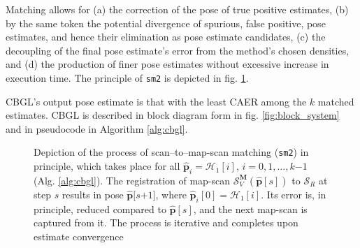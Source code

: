 Matching allows for (a) the correction of the pose of true positive estimates,
(b) by the same token the potential divergence of spurious, false positive,
pose estimates, and hence their elimination as pose estimate candidates, (c)
the decoupling of the final pose estimate's error from the method's chosen
densities, and (d) the production of finer pose estimates without excessive
increase in execution time. The principle of \texttt{sm2} is depicted in fig.
\ref{fig:sm2_evolution}.

CBGL's output pose estimate is that with the least CAER among the $k$ matched
estimates. CBGL is described in block diagram form in fig.
\ref{fig:block_system} and in pseudocode in Algorithm \ref{alg:cbgl}.

\begin{figure}[]\vspace{1.5cm}
  
  \caption{\small Depiction of the process of scan--to--map-scan matching
           (\texttt{sm2}) in principle, which takes place for all
           $\hat{\bm{p}}_i = \mathcal{H}_1[i]$, $i=0,1,\dots,k$$-$$1$ (Alg.
           \ref{alg:cbgl}). The registration of map-scan
           $\mathcal{S}_V^{\bm{M}}(\hat{\bm{p}}[s])$ to $\mathcal{S}_R$ at step
           $s$ results in pose $\hat{\bm{p}}[s$$+$$1]$, where
           $\hat{\bm{p}}_i[0] = \mathcal{H}_1[i]$. Its error is, in principle,
           reduced compared to $\hat{\bm{p}}[s]$, and the next map-scan is
           captured from it. The process is iterative and completes upon
           estimate convergence}
  \label{fig:sm2_evolution}
\end{figure}



